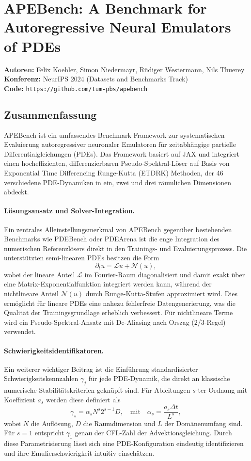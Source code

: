 \documentclass[a4paper,12pt]{article}
\begin{document}
\section*{APEBench: A Benchmark for Autoregressive Neural Emulators of PDEs}
\textbf{Autoren:} Felix Koehler, Simon Niedermayr, Rüdiger Westermann, Nils Thuerey \\
\textbf{Konferenz:} NeurIPS 2024 (Datasets and Benchmarks Track) \\
\textbf{Code:} \texttt{https://github.com/tum-pbs/apebench}

\subsection*{Zusammenfassung}

APEBench ist ein umfassendes Benchmark-Framework zur systematischen Evaluierung autoregressiver neuronaler Emulatoren für zeitabhängige partielle Differentialgleichungen (PDEs). Das Framework basiert auf JAX und integriert einen hocheffizienten, differenzierbaren Pseudo-Spektral-Löser auf Basis von Exponential Time Differencing Runge-Kutta (ETDRK) Methoden, der 46 verschiedene PDE-Dynamiken in ein, zwei und drei räumlichen Dimensionen abdeckt.

\paragraph{Lösungsansatz und Solver-Integration.}
Ein zentrales Alleinstellungsmerkmal von APEBench gegenüber bestehenden Benchmarks wie PDEBench oder PDEArena ist die enge Integration des numerischen Referenzlösers direkt in den Trainings- und Evaluierungsprozess. Die unterstützten semi-linearen PDEs besitzen die Form
\[
\partial_t u = \mathcal{L}u + \mathcal{N}(u),
\]
wobei der lineare Anteil $\mathcal{L}$ im Fourier-Raum diagonalisiert und damit exakt über eine Matrix-Exponentialfunktion integriert werden kann, während der nichtlineare Anteil $\mathcal{N}(u)$ durch Runge-Kutta-Stufen approximiert wird. Dies ermöglicht für lineare PDEs eine nahezu fehlerfreie Datengenerierung, was die Qualität der Trainingsgrundlage erheblich verbessert. Für nichtlineare Terme wird ein Pseudo-Spektral-Ansatz mit De-Aliasing nach Orszag (2/3-Regel) verwendet.

\paragraph{Schwierigkeitsidentifikatoren.}
Ein weiterer wichtiger Beitrag ist die Einführung standardisierter Schwierigkeitskennzahlen $\gamma_j$ für jede PDE-Dynamik, die direkt an klassische numerische Stabilitätskriterien geknüpft sind. Für Ableitungen $s$-ter Ordnung mit Koeffizient $a_s$ werden diese definiert als
\[
\gamma_s = \alpha_s N^s 2^{s-1} D, \quad \text{mit} \quad \alpha_s = \frac{a_s \Delta t}{L^s},
\]
wobei $N$ die Auflösung, $D$ die Raumdimension und $L$ der Domänenumfang sind. Für $s=1$ entspricht $\gamma_1$ genau der CFL-Zahl der Advektionsgleichung. Durch diese Parametrisierung lässt sich eine PDE-Konfiguration eindeutig identifizieren und ihre Emulierschwierigkeit intuitiv einschätzen.
\end{document}
